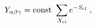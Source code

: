\begin{equation}
Y_{\alpha \beta \gamma}= {\rm const}~ \sum_{X_{\rm cl}} e^{-S_{\rm cl}} \;,
\label{string}
\end{equation}

